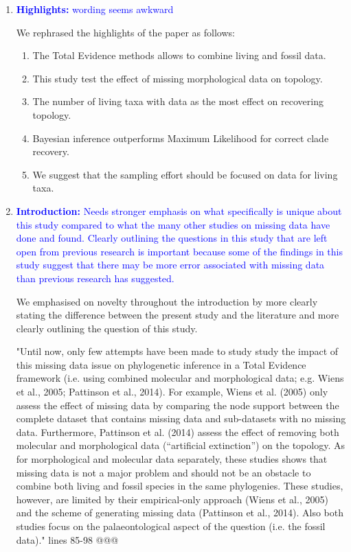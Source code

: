 \documentclass[12pt,letterpaper]{article}
\begin{document}
\begin{enumerate}
\item{\textcolor{blue}{\textbf{Highlights:} wording seems awkward}}

We rephrased the highlights of the paper as follows: %

\begin{enumerate}[(1)]
\item The Total Evidence methods allows to combine living and fossil data.
\item This study test the effect of missing morphological data on topology.
\item The number of living taxa with data as the most effect on recovering topology.
\item Bayesian inference outperforms Maximum Likelihood for correct clade recovery.
\item We suggest that the sampling effort should be focused on data for living taxa.
\end{enumerate}


\item{\textcolor{blue}{\textbf{Introduction:} Needs stronger emphasis on what specifically is unique about this study compared to what the many other studies on missing data have done and found.
Clearly outlining the questions in this study that are left open from previous research is important because some of the findings in this study suggest that there may be more error associated with missing data than previous research has suggested.}}

We emphasised on novelty throughout the introduction by more clearly stating the difference between the present study and the literature and more clearly outlining the question of this study.

"Until now, only few attempts have been made to study study the impact of this missing data issue on phylogenetic inference in a Total Evidence framework (i.e. using combined molecular and morphological data; e.g. Wiens et al., 2005; Pattinson et al., 2014).
For example, Wiens et al. (2005) only assess the effect of missing data by comparing the node support between the complete dataset that contains missing data and sub-datasets with no missing data.
Furthermore, Pattinson et al. (2014) assess the effect of removing both molecular and morphological data (“artificial extinction”) on the topology.
As for morphological and molecular data separately, these studies shows that missing data is not a major problem and should not be an obstacle to combine both living and fossil species in the same phylogenies.
These studies, however, are limited by their empirical-only approach (Wiens et al., 2005) and the scheme of generating missing data (Pattinson et al., 2014).
Also both studies focus on the palaeontological aspect of the question (i.e. the fossil data)." lines 85-98 @@@


\end{enumerate}
\end{document}
